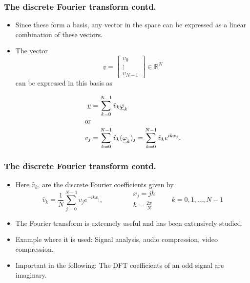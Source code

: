 \documentclass{beamer}
\begin{document}
\begin{frame}\frametitle{The discrete Fourier transform contd.}
  \begin{itemize}
    \item Since these form a basis, any vector in the space can be expressed
      as a linear combination of these vectors.
    \item The vector 
      \begin{equation*}
        \underline{v} = 
        \begin{bmatrix}
          v_0 \\
          \vdots \\
          v_{N-1}
        \end{bmatrix}
        \in \mathbb{R}^N
      \end{equation*}
      can be expressed in this basis as

      \begin{align*}
        \underline{v} &= \sum_{k=0}^{N-1} \hat{v}_k \underline{\varphi}_k \\
        \intertext{or}
        v_j &= \sum_{k=0}^{N-1} \hat{v}_k (\underline{\varphi}_k)_j = \sum_{k=0}^{N-1} \hat{v}_k e^{ik x_j}.
      \end{align*}
  \end{itemize}
\end{frame}
\begin{frame}\frametitle{The discrete Fourier transform contd.}
  \begin{itemize}
    \item Here $\hat{v}_k$, are the discrete Fourier coefficients given by
      \begin{equation*}
        \hat{v}_k = \frac{1}{N} \sum_{j=0}^{N-1} v_j e^{-ik x_j}, \qquad \qquad 
        \begin{matrix}
          x_j = j h \\
          h = \frac{2\pi}{N}
        \end{matrix}
        \qquad k=0,1,\ldots,N-1
      \end{equation*}
    \item The Fourier transform is extremely useful and has been extensively studied.
    \item Example where it is used: Signal analysis, audio compression, video compression.
    \item Important in the following: The DFT coefficients of an odd signal are imaginary.
  \end{itemize}
\end{frame}
\end{document}
